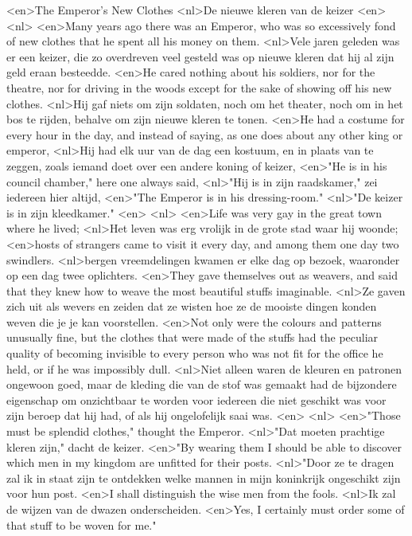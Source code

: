 <en>The Emperor's New Clothes
<nl>De nieuwe kleren van de keizer
<en>
<nl>
<en>Many years ago there was an Emperor, who was so excessively fond of new clothes that he spent all his money on them.
<nl>Vele jaren geleden was er een keizer, die zo overdreven veel gesteld was op nieuwe kleren dat hij al zijn geld eraan besteedde.
<en>He cared nothing about his soldiers, nor for the theatre, nor for driving in the woods except for the sake of showing off his new clothes.
<nl>Hij gaf niets om zijn soldaten, noch om het theater, noch om in het bos te rijden, behalve om zijn nieuwe kleren te tonen.
<en>He had a costume for every hour in the day, and instead of saying, as one does about any other king or emperor,
<nl>Hij had elk uur van de dag een kostuum, en in plaats van te zeggen, zoals iemand doet over een andere koning of keizer,
<en>"He is in his council chamber," here one always said,
<nl>"Hij is in zijn raadskamer," zei iedereen hier altijd,
<en>"The Emperor is in his dressing-room."
<nl>"De keizer is in zijn kleedkamer."
<en>
<nl>
<en>Life was very gay in the great town where he lived;
<nl>Het leven was erg vrolijk in de grote stad waar hij woonde;
<en>hosts of strangers came to visit it every day, and among them one day two swindlers.
<nl>bergen vreemdelingen kwamen er elke dag op bezoek, waaronder op een dag twee oplichters.
<en>They gave themselves out as weavers, and said that they knew how to weave the most beautiful stuffs imaginable.
<nl>Ze gaven zich uit als wevers en zeiden dat ze wisten hoe ze de mooiste dingen konden weven die je je kan voorstellen.
<en>Not only were the colours and patterns unusually fine, but the clothes that were made of the stuffs had the peculiar quality of becoming invisible to every person who was not fit for the office he held, or if he was impossibly dull.
<nl>Niet alleen waren de kleuren en patronen ongewoon goed, maar de kleding die van de stof was gemaakt had de bijzondere eigenschap om onzichtbaar te worden voor iedereen die niet geschikt was voor zijn beroep dat hij had, of als hij ongelofelijk saai was.
<en>
<nl>
<en>"Those must be splendid clothes," thought the Emperor.
<nl>"Dat moeten prachtige kleren zijn," dacht de keizer.
<en>"By wearing them I should be able to discover which men in my kingdom are unfitted for their posts.
<nl>"Door ze te dragen zal ik in staat zijn te ontdekken welke mannen in mijn koninkrijk ongeschikt zijn voor hun post.
<en>I shall distinguish the wise men from the fools.
<nl>Ik zal de wijzen van de dwazen onderscheiden.
<en>Yes, I certainly must order some of that stuff to be woven for me."
